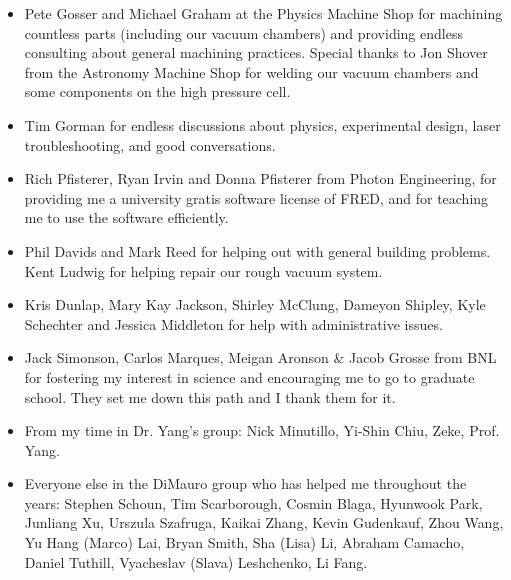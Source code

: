 \begin{acknowledgments}
\begin{itemize}
	\item Pete Gosser and Michael Graham at the Physics Machine Shop for machining countless parts (including our vacuum chambers) and providing endless consulting about general machining practices. Special thanks to Jon Shover from the Astronomy Machine Shop for welding our vacuum chambers and some components on the high pressure cell.
	\item Tim Gorman for endless discussions about physics, experimental design, laser troubleshooting, and good conversations.
	\item Rich Pfisterer, Ryan Irvin and Donna Pfisterer from Photon Engineering, for providing me a university gratis software license of FRED, and for teaching me to use the software efficiently.
	\item Phil Davids and Mark Reed for helping out with general building problems. Kent Ludwig for helping repair our rough vacuum system.
	\item Kris Dunlap, Mary Kay Jackson, Shirley McClung, Dameyon Shipley, Kyle Schechter and Jessica Middleton for help with administrative issues.
	\item Jack Simonson, Carlos Marques, Meigan Aronson \& Jacob Grosse from BNL for fostering my interest in science and encouraging me to go to graduate school. They set me down this path and I thank them for it.
	\item From my time in Dr. Yang's group: Nick Minutillo, Yi-Shin Chiu, Zeke, Prof. Yang.
	\item Everyone else in the DiMauro group who has helped me throughout the years: Stephen Schoun, Tim Scarborough, Cosmin Blaga, Hyunwook Park, Junliang Xu, Urszula Szafruga, Kaikai Zhang, Kevin Gudenkauf, Zhou Wang, Yu Hang (Marco) Lai, Bryan Smith, Sha (Lisa) Li, Abraham Camacho, Daniel Tuthill, Vyacheslav (Slava) Leshchenko, Li Fang.
\end{itemize}


\end{acknowledgments}